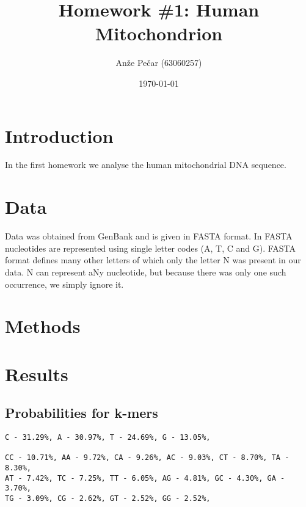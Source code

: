 \documentclass[a4paper,11pt]{article}
\title{Homework \#1: Human Mitochondrion}
\author{Anže Pečar (63060257)}
\date{\today}
\begin{document}
\maketitle

\section{Introduction}

In the first homework we analyse the human mitochondrial DNA sequence.   

\section{Data}

Data was obtained from GenBank and is given in FASTA format. In FASTA nucleotides are represented using single letter codes (A, T, C and G). FASTA format defines many other letters of which only the letter N was present in our data. N can represent aNy nucleotide, but because there was only one such occurrence, we simply ignore it. 

\section{Methods}





\section{Results}

\subsection{Probabilities for k-mers}
\begin{lstlisting}
C - 31.29%, A - 30.97%, T - 24.69%, G - 13.05%, 

CC - 10.71%, AA - 9.72%, CA - 9.26%, AC - 9.03%, CT - 8.70%, TA - 8.30%, 
AT - 7.42%, TC - 7.25%, TT - 6.05%, AG - 4.81%, GC - 4.30%, GA - 3.70%, 
TG - 3.09%, CG - 2.62%, GT - 2.52%, GG - 2.52%, 

\end{lstlisting}
\end{document}
